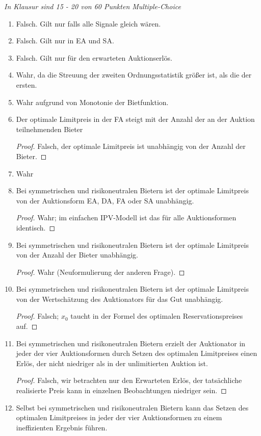 \documentclass[12pt]{extreport} %
\theoremstyle{named}
\theoremstyle{itshape}
\theoremstyle{normal}
\begin{document}
\textit{In Klausur sind 15 - 20 von 60 Punkten Multiple-Choice}

\begin{enumerate} 
	\item Falsch. Gilt nur falls alle Signale gleich wären.
	\item Falsch. Gilt nur in EA und SA.
	\item Falsch. Gilt nur für den erwarteten Auktionserlös.
	\item Wahr, da die Streuung der zweiten Ordnungsstatistik größer ist, als die der ersten.
	\item Wahr aufgrund von Monotonie der Bietfunktion.
	\item Der optimale Limitpreis in der FA steigt mit der Anzahl der an der Auktion teilnehmenden Bieter 
		\begin{proof}
			Falsch, der optimale Limitpreis ist unabhängig von der Anzahl der Bieter.	
		\end{proof} 
	\item Wahr
	\item Bei symmetrischen und risikoneutralen Bietern ist der optimale Limitpreis von der Auktionsform EA, DA, FA oder SA unabhängig.
		\begin{proof}
			Wahr; im einfachen IPV-Modell ist das für alle Auktionsformen identisch.
		\end{proof}
	\item Bei symmetrischen und risikoneutralen Bietern ist der optimale Limitpreis von der Anzahl der Bieter unabhängig.
		\begin{proof}
			Wahr (Neuformulierung der anderen Frage).
		\end{proof}
	\item Bei symmetrischen und risikoneutralen Bietern ist der optimale Limitpreis von der Wertschätzung des Auktionators für das Gut unabhängig.
		\begin{proof}
			Falsch; $x_{0}$ taucht in der Formel des optimalen Reservationspreises auf.
		\end{proof}
	\item Bei symmetrischen und risikoneutralen Bietern erzielt der Auktionator in jeder der vier Auktionsformen durch Setzen des optimalen Limitpreises einen Erlös, der nicht niedriger als in der unlimitierten Auktion ist.
		\begin{proof}
			Falsch, wir betrachten nur den Erwarteten Erlös, der tatsächliche realisierte Preis kann in einzelnen Beobachtungen niedriger sein.
		\end{proof}
	\item Selbst bei symmetrischen und risikoneutralen Bietern kann das Setzen des optimalen Limitpreises in jeder der vier Auktionsformen zu einem ineffizienten Ergebnis führen.

\end{enumerate}
\end{document}
